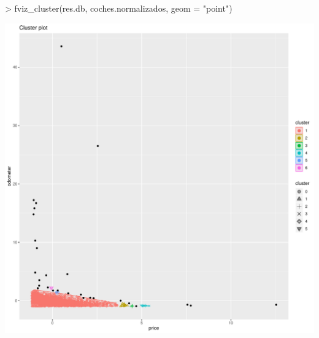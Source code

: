 \documentclass[a4paper]{article}
\begin{document}
\begin{Schunk}
\begin{Sinput}
> fviz_cluster(res.db, coches.normalizados, geom = "point")
\end{Sinput}
\end{Schunk}
\includegraphics{Practica4-dbscan}
\end{document}
